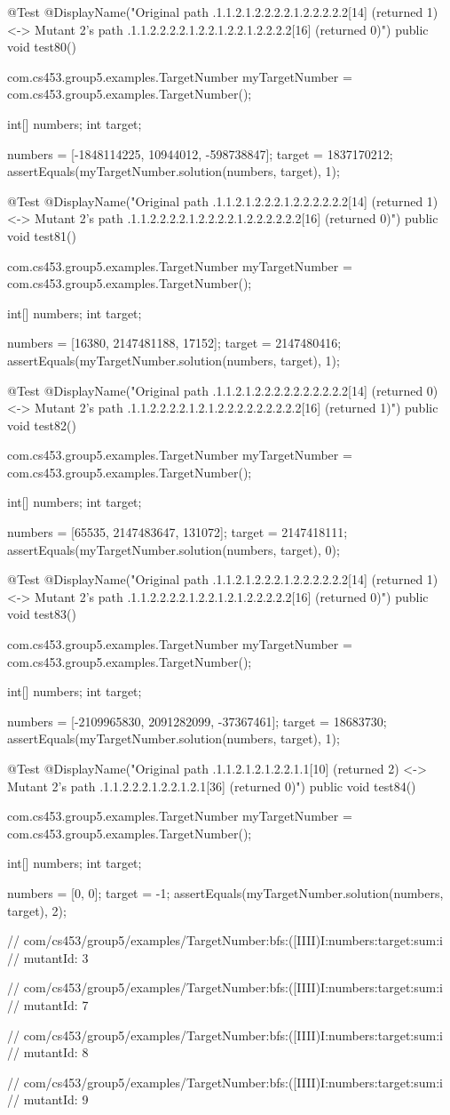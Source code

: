 @Test
@DisplayName("Original path .1.1.2.1.2.2.2.2.1.2.2.2.2.2[14] (returned 1) <-> Mutant 2's path .1.1.2.2.2.2.1.2.2.1.2.2.1.2.2.2.2[16] (returned 0)")
public void test80() {
    com.cs453.group5.examples.TargetNumber myTargetNumber = com.cs453.group5.examples.TargetNumber();

    int[] numbers;
    int target;

    numbers = [-1848114225, 10944012, -598738847];
    target = 1837170212;
    assertEquals(myTargetNumber.solution(numbers, target), 1);
}

@Test
@DisplayName("Original path .1.1.2.1.2.2.2.1.2.2.2.2.2.2[14] (returned 1) <-> Mutant 2's path .1.1.2.2.2.2.1.2.2.2.2.1.2.2.2.2.2.2[16] (returned 0)")
public void test81() {
    com.cs453.group5.examples.TargetNumber myTargetNumber = com.cs453.group5.examples.TargetNumber();

    int[] numbers;
    int target;

    numbers = [16380, 2147481188, 17152];
    target = 2147480416;
    assertEquals(myTargetNumber.solution(numbers, target), 1);
}

@Test
@DisplayName("Original path .1.1.2.1.2.2.2.2.2.2.2.2.2.2[14] (returned 0) <-> Mutant 2's path .1.1.2.2.2.2.1.2.1.2.2.2.2.2.2.2.2.2[16] (returned 1)")
public void test82() {
    com.cs453.group5.examples.TargetNumber myTargetNumber = com.cs453.group5.examples.TargetNumber();

    int[] numbers;
    int target;

    numbers = [65535, 2147483647, 131072];
    target = 2147418111;
    assertEquals(myTargetNumber.solution(numbers, target), 0);
}

@Test
@DisplayName("Original path .1.1.2.1.2.2.2.1.2.2.2.2.2.2[14] (returned 1) <-> Mutant 2's path .1.1.2.2.2.2.1.2.2.1.2.1.2.2.2.2.2[16] (returned 0)")
public void test83() {
    com.cs453.group5.examples.TargetNumber myTargetNumber = com.cs453.group5.examples.TargetNumber();

    int[] numbers;
    int target;

    numbers = [-2109965830, 2091282099, -37367461];
    target = 18683730;
    assertEquals(myTargetNumber.solution(numbers, target), 1);
}

@Test
@DisplayName("Original path .1.1.2.1.2.1.2.2.1.1[10] (returned 2) <-> Mutant 2's path .1.1.2.2.2.1.2.2.1.2.1[36] (returned 0)")
public void test84() {
    com.cs453.group5.examples.TargetNumber myTargetNumber = com.cs453.group5.examples.TargetNumber();

    int[] numbers;
    int target;

    numbers = [0, 0];
    target = -1;
    assertEquals(myTargetNumber.solution(numbers, target), 2);
}

// com/cs453/group5/examples/TargetNumber:bfs:([IIII)I:numbers:target:sum:i
// mutantId: 3


// com/cs453/group5/examples/TargetNumber:bfs:([IIII)I:numbers:target:sum:i
// mutantId: 7


// com/cs453/group5/examples/TargetNumber:bfs:([IIII)I:numbers:target:sum:i
// mutantId: 8


// com/cs453/group5/examples/TargetNumber:bfs:([IIII)I:numbers:target:sum:i
// mutantId: 9


